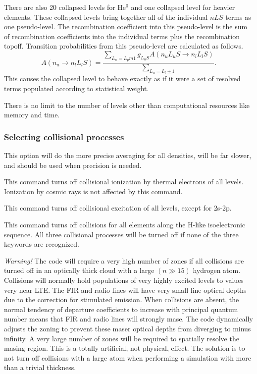 There are also 20 collapsed levels for He$^0$ and one collapsed level for heavier elements.
These collapsed levels
bring together all of the individual $nLS$ terms as one pseudo-level.
The
recombination coefficient into this pseudo-level is the sum of recombination
coefficients into the individual terms plus the recombination topoff.
Transition probabilities from this pseudo-level are calculated as follows.
\begin{equation}
A(n_u \to n_lL_lS)= \frac{\sum_{L_u=L_pm 1} g_{L_{u}S} A(n_uL_uS\to
n_lL_lS)}{\sum_{L_u=L_l\pm 1}}.%
\end{equation}
This causes the collapsed level to behave exactly as if it were a set of
resolved terms populated according to statistical weight.

There is no limit to the number of levels other than computational resources
like memory and time.

\subsubsection{Selecting  collisional processes}


 This option will do the more
precise averaging for all densities, will
be far slower, and should be used when precision is needed. 

This command turns off collisional
ionization by thermal electrons of all levels.
Ionization by
cosmic rays is not affected by this command.

This command turns off collisional
excitation of all levels, except for 2s-2p.

This command turns off collisions for all elements along the H-like
isoelectronic sequence.
All three collisional processes will be turned
off if none of the three keywords are recognized.

\emph{Warning!}  The code will require a very high number of zones
if all collisions
are turned off in an optically thick cloud with a large
$(n \gg 15)$ hydrogen atom.
Collisions will normally hold populations of very highly excited
levels to values very near LTE.
The FIR and radio lines will have very
small line optical depths due to the correction for stimulated emission.
When collisions are absent, the normal tendency of departure coefficients
to increase with principal quantum number means that FIR and radio lines
will strongly mase.
The code dynamically adjusts the zoning to prevent
these maser optical depths from diverging to minus infinity.
A very large
number of zones will be required to spatially resolve the masing region.
This is a totally artificial, not physical, effect.
The solution is to
not turn off collisions with a large atom when performing a
simulation with more than a trivial thickness.


